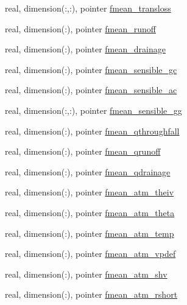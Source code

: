 \begin{DoxyCompactItemize}
\item 
real, dimension(\+:,\+:), pointer \hyperlink{structed__state__vars_1_1edtype_a950f2bd584d9e2bcad2e1fece859e385}{fmean\+\_\+transloss}
\item 
real, dimension(\+:), pointer \hyperlink{structed__state__vars_1_1edtype_aa8ed3a911ab710017ccee90d667aafeb}{fmean\+\_\+runoff}
\item 
real, dimension(\+:), pointer \hyperlink{structed__state__vars_1_1edtype_a664d77111f7de6f65ae7c1493ebfac85}{fmean\+\_\+drainage}
\item 
real, dimension(\+:), pointer \hyperlink{structed__state__vars_1_1edtype_aea789d89ac0b7f8fe532cc7e12651e3f}{fmean\+\_\+sensible\+\_\+gc}
\item 
real, dimension(\+:), pointer \hyperlink{structed__state__vars_1_1edtype_aa077377b7b0528035079b3df28fa53e0}{fmean\+\_\+sensible\+\_\+ac}
\item 
real, dimension(\+:,\+:), pointer \hyperlink{structed__state__vars_1_1edtype_a59704439a96ed6ec31aff0b3f22ce8e8}{fmean\+\_\+sensible\+\_\+gg}
\item 
real, dimension(\+:), pointer \hyperlink{structed__state__vars_1_1edtype_af043a84200872866ea5950189e519986}{fmean\+\_\+qthroughfall}
\item 
real, dimension(\+:), pointer \hyperlink{structed__state__vars_1_1edtype_a9f7d1305fbc15f424d0a742d0ed7b565}{fmean\+\_\+qrunoff}
\item 
real, dimension(\+:), pointer \hyperlink{structed__state__vars_1_1edtype_aa36671b1e8c4b8eb4c7c9c2cb06aa28e}{fmean\+\_\+qdrainage}
\item 
real, dimension(\+:), pointer \hyperlink{structed__state__vars_1_1edtype_ac89ea1b6a1cb7de0828ad93304a4420f}{fmean\+\_\+atm\+\_\+theiv}
\item 
real, dimension(\+:), pointer \hyperlink{structed__state__vars_1_1edtype_adc581e25d46408966fc900282e2ee3b5}{fmean\+\_\+atm\+\_\+theta}
\item 
real, dimension(\+:), pointer \hyperlink{structed__state__vars_1_1edtype_aa807970f9663fbe4726f2f046e869d93}{fmean\+\_\+atm\+\_\+temp}
\item 
real, dimension(\+:), pointer \hyperlink{structed__state__vars_1_1edtype_a175b8a207573d0c313395a97b4686bb6}{fmean\+\_\+atm\+\_\+vpdef}
\item 
real, dimension(\+:), pointer \hyperlink{structed__state__vars_1_1edtype_af5beb6dfd66559270ac05e2700536f7a}{fmean\+\_\+atm\+\_\+shv}
\item 
real, dimension(\+:), pointer \hyperlink{structed__state__vars_1_1edtype_a8089882c894678380326f661b49d054f}{fmean\+\_\+atm\+\_\+rshort}

\end{DoxyCompactItemize}
